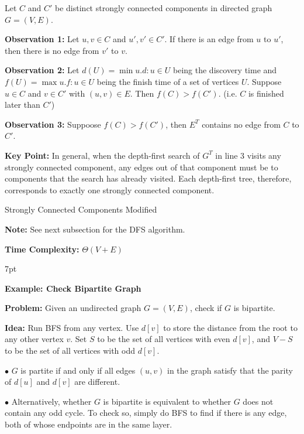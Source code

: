 \documentclass[10pt]{article}
\newenvironment{formal}[2]{%
	\def\FrameCommand{%
		\hspace{1pt}%
		{\color{#1}\vrule width 2pt}%
		{\color{#2}\vrule width 4pt}%
		\colorbox{#2}%
	}%
	\MakeFramed{\advance\hsize-\width\FrameRestore}%
	\noindent\hspace{-4.55pt}%
	\begin{adjustwidth}{}{7pt}%
		\vspace{2pt}\vspace{2pt}%
	}
	{%
		\vspace{2pt}\end{adjustwidth}\endMakeFramed%
}
\begin{document}
Let $C$ and $C'$ be distinct strongly connected components in directed graph $G=(V, E)$.

\textbf{Observation 1:} Let $u, v \in C$ and $u', v' \in C'$. If there is an edge from $u$ to $u'$, then there is no edge from $v'$ to $v$.

\textbf{Observation 2:} Let $d(U) = \min{u.d: u \in U}$ being the discovery time and $f(U) = \max{u.f: u \in U}$ being the finish time of a set of vertices $U$. Suppose $u \in C$ and $v \in C'$ with $(u, v) \in E$. Then $f(C) > f(C')$. (i.e. $C$ is finished later than $C'$)

\textbf{Observation 3:} Suppoose $f(C) > f(C')$, then $E^T$ contains no edge from $C$ to $C'$.

\textbf{Key Point:} In general, when the depth-first search of 
$G^T$ in line 3 visits any strongly connected component, any edges out of that component must be to components that the search has already visited. Each depth-first tree, therefore, corresponds to exactly one strongly connected component.

\begin{algorithm}
	\SetAlgoLined

	\caption{Strongly Connected Components Modified}
\end{algorithm}

\textbf{Note:} See next subsection for the DFS algorithm.

\textbf{Time Complexity:} $\Theta(V+E)$

\newpage

\begin{formal}{Brown}{brownshade}
	
	\textbf{Example: Check Bipartite Graph}

	\textbf{Problem:} Given an undirected graph $G = (V, E)$, check if $G$ is bipartite.

	\textbf{Idea:} Run BFS from any vertex. Use $d[v]$ to store the distance from the root to any other vertex $v$. Set $S$ to be the set of all vertices with even $d[v]$, and $V-S$ to be the set of all vertices with odd $d[v]$.

	$\bullet$ $G$ is partite if and only if all edges $(u, v)$ in the graph satisfy that the parity of $d[u]$ and $d[v]$ are different.

	$\bullet$ Alternatively, whether $G$ is bipartite is equivalent to whether $G$ does not contain any odd cycle. To check so, simply do BFS to find if there is any edge, both of whose endpoints are in the same layer.
	
\end{formal}
\end{document}
